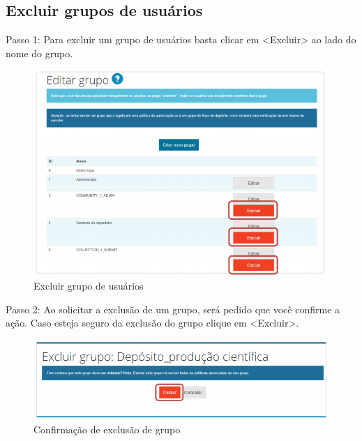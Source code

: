 \documentclass[12pt,hidelinks]{article}
\begin{document}
\newpage
    
    \subsection{Excluir grupos de usuários}
    
    Passo 1: Para excluir um grupo de usuários basta clicar em <Excluir> ao lado do nome do grupo.
    
    \begin{figure}[!htp]
                \centering
                \includegraphics[scale=0.8]{figura/Figura67.png}
                \caption{Excluir grupo de usuários}
            \label{Rotulo}
        \end{figure}
    
    Passo 2: Ao solicitar a exclusão de um grupo, será pedido que você confirme a ação. Caso esteja seguro da exclusão do grupo clique em <Excluir>.
    
    \begin{figure}[!htp]
                \centering
                \includegraphics[scale=0.8]{figura/Figura68.png}
                \caption{Confirmação de exclusão de grupo}
            \label{Rotulo}
        \end{figure}

\newpage
\end{document}
